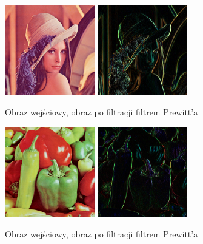 \documentclass[final,a4paper,openany,12pt]{mwbk}
\begin{document}
\begin{figure}[H]
	\begin{center}
		\includegraphics[width=0.35\textwidth]{lena_color}
		\includegraphics[width=0.35\textwidth]{lena_color_highpassPrewitt_result}
	\end{center}
	\caption{Obraz wejściowy, obraz po filtracji filtrem Prewitt'a}
\end{figure}

\begin{figure}[H]
	\begin{center}
		\includegraphics[width=0.35\textwidth]{peppers_color}
		\includegraphics[width=0.35\textwidth]{peppers_color_highpassPrewitt_result}
	\end{center}
	\caption{Obraz wejściowy, obraz po filtracji filtrem Prewitt'a}
\end{figure}
\newpage
\end{document}
